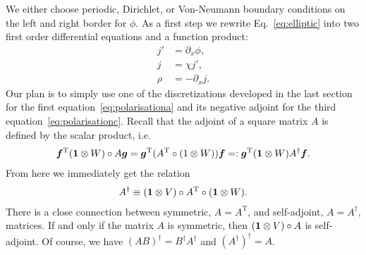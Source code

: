 We either choose periodic, Dirichlet, or Von-Neumann boundary conditions on the 
left and right border for $\phi$. 
As a first step we rewrite Eq.~\eqref{eq:elliptic} into two first order differential equations and a function product:
\begin{subequations}
\begin{align}
    j'&= \partial_x \phi, \label{eq:polarisationa}\\
    j &= \chi j', \label{eq:polarisationb}\\
    \rho &= -\partial_x j. \label{eq:polarisationc}
\end{align}
\end{subequations}
Our plan is to simply use one of the discretizations developed in the last
section for the first equation~\eqref{eq:polarisationa}
and its negative adjoint for the third equation~\eqref{eq:polarisationc}.
Recall that the adjoint of a square matrix $A$ is defined by the scalar product, i.e.
\begin{align}
    {\boldsymbol{f}}^\mathrm{T} (\mathbf{1}\otimes W)\circ A{\boldsymbol{g}} = 
    {\boldsymbol{g}}^\mathrm{T} (A^\mathrm{T}\circ(1\otimes W)) {\boldsymbol{f}} =:     {\boldsymbol{g}}^\mathrm{T} (\mathbf{1}\otimes W) A^\dagger {\boldsymbol{f}}. \nonumber
    \label{}
\end{align}
From here we immediately get the relation
\begin{align}
    A^\dagger \equiv (\mathbf{1}\otimes V)\circ A^\mathrm{T}\circ (\mathbf{1}\otimes W).
    \label{eq:adjoint}
\end{align}
There is a close connection between symmetric, $A=A^\mathrm{T}$, and self-adjoint, $A=A^\dagger$, matrices.
If and only if the matrix $A$ is symmetric, then $(\mathbf{1}\otimes V)\circ A$ is self-adjoint. Of course, we have $(AB)^\dagger = B^\dagger A^\dagger$ and $(A^\dagger)^\dagger = A$.

